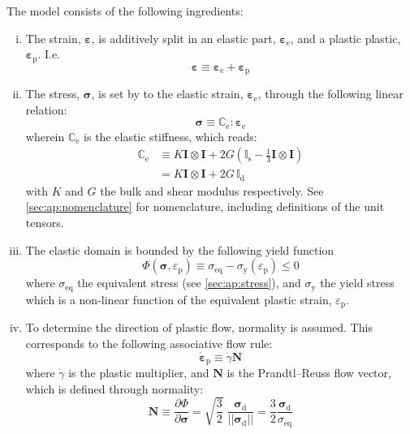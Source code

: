 \documentclass[namecite, fleqn]{goose-article}
\begin{document}
The model consists of the following ingredients:
\begin{enumerate}[(i)]

    \item The strain, $\bm{\varepsilon}$, is additively split in an elastic part,
    $\bm{\varepsilon}_\mathrm{e}$, and a plastic plastic, $\bm{\varepsilon}_\mathrm{p}$.
    I.e.
    \begin{equation}
        \bm{\varepsilon} \equiv \bm{\varepsilon}_\mathrm{e} + \bm{\varepsilon}_\mathrm{p}
    \end{equation}

    \item The stress, $\bm{\sigma}$, is set by to the elastic strain,
    $\bm{\varepsilon}_\mathrm{e}$, through the following linear relation:
    \begin{equation}
        \bm{\sigma} \equiv \mathbb{C}_\mathrm{e} : \bm{\varepsilon}_\mathrm{e}
    \end{equation}
    wherein $\mathbb{C}_\mathrm{e}$ is the elastic stiffness, which reads:
    \begin{align}
        \mathbb{C}_\mathrm{e}
        &\equiv K \bm{I} \otimes \bm{I}
        + 2 G (\mathbb{I}_\mathrm{s} - \tfrac{1}{3} \bm{I} \otimes \bm{I} )
        \\
        &= K \bm{I} \otimes \bm{I}
        + 2 G \, \mathbb{I}_\mathrm{d}
    \end{align}
    with $K$ and $G$ the bulk and shear modulus respectively.
    See \cref{sec:ap:nomenclature} for nomenclature,
    including definitions of the unit tensors.

    \item The elastic domain is bounded by the following yield function
    \begin{equation}
        \Phi( \bm{\sigma} , \varepsilon_\mathrm{p} )
        \equiv \sigma_\mathrm{eq} - \sigma_\mathrm{y} (\varepsilon_\mathrm{p}) \leq 0
    \end{equation}
    where $\sigma_\mathrm{eq}$ the equivalent stress (see \cref{sec:ap:stress}),
    and $\sigma_\mathrm{y}$ the yield stress which is a non-linear function of
    the equivalent plastic strain, $\varepsilon_\mathrm{p}$.

    \item To determine the direction of plastic flow, normality is assumed.
    This corresponds to the following associative flow rule:
    \begin{equation}
        \dot{\bm{\varepsilon}}_\mathrm{p} \equiv \dot{\gamma} \bm{N}
    \end{equation}
    where $\dot{\gamma}$ is the plastic multiplier, and $\bm{N}$ is the Prandtl--Reuss flow vector,
    which is defined through normality:
    \begin{equation}
        \bm{N} \equiv \frac{\partial \Phi}{\partial \bm{\sigma}}
        = \sqrt{\frac{3}{2}} \;
        \frac{\bm{\sigma}_\mathrm{d}}{|| \bm{\sigma}_\mathrm{d} ||}
        = \frac{3}{2}
        \frac{\bm{\sigma}_\mathrm{d}}{\sigma_\mathrm{eq}}
    \end{equation}


\end{enumerate}
\end{document}

